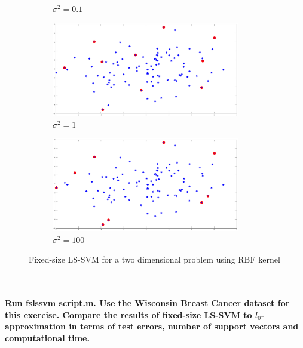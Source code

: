 \begin{figure}[!htpb]
\begin{subfigure}[b]{0.25\textwidth}
		\caption{$\sigma^2 = 0.1$}\label{fig:fixed_lssvm_sig_0.1}
	\end{subfigure}%
	\begin{subfigure}[b]{0.25\textwidth}
		\centering
		\includegraphics[height= 0.65\textwidth, width = 0.9\textwidth]{Exercise3/Report/fixed_lssvm_sig_1}
		\caption{$\sigma^2 = 1$}\label{fig:fixed_lssvm_sig_1}
	\end{subfigure}%
	\begin{subfigure}[b]{0.25\textwidth}
		\centering
		\includegraphics[height= 0.65\textwidth, width = 0.9\textwidth]{Exercise3/Report/fixed_lssvm_sig_100}
		\caption{$\sigma^2 = 100$}\label{fig:fixed_lssvm_sig_100}
	\end{subfigure}%
	\caption{Fixed-size LS-SVM for a two dimensional problem using
		RBF kernel}
	\label{fig:fixedlssvm}
\end{figure}\\\\
\textbf{Run fslssvm script.m. Use the Wisconsin Breast Cancer dataset for this exercise. Compare the results of fixed-size LS-SVM to $l_0$-approximation in terms of test errors, number of support vectors and computational time.}

